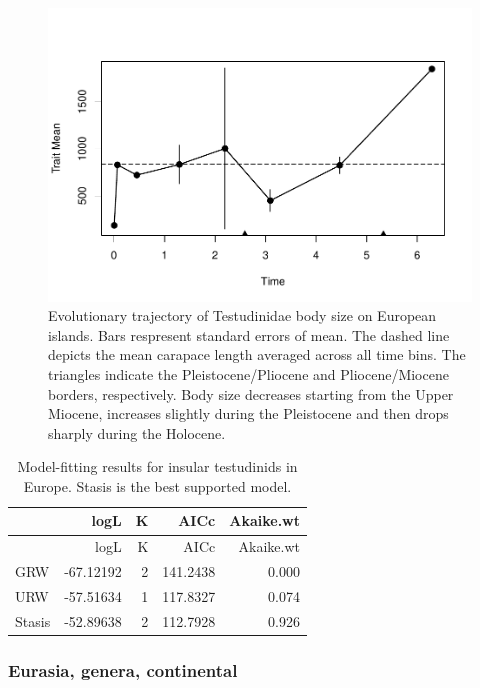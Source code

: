 \begin{figure}[H]
	\centering
	\includegraphics{MA_JJ_files/figure-latex/pTSEuI-1.pdf}
	\caption[PaleoTS plot of insular \T in Europe]{Evolutionary trajectory of Testudinidae body size on European islands. Bars respresent standard errors of mean. The dashed line depicts the mean carapace length averaged across all time bins. The triangles indicate the Pleistocene/Pliocene and Pliocene/Miocene borders, respectively. Body size decreases starting from the Upper Miocene, increases slightly during the Pleistocene and then drops sharply during the Holocene.
	}
	\label{fig:pTSEuI}
\end{figure}

\begin{longtable}[]{@{}lrrrr@{}}
	\caption[Model fits for insular \T in Europe]{Model-fitting results for insular testudinids in Europe. Stasis is the best supported model.}
	\label{tab:pTSEuIEM}\tabularnewline
	\toprule
	& logL & K & AICc & Akaike.wt\tabularnewline
	\midrule
	\endfirsthead
	\toprule
	& logL & K & AICc & Akaike.wt\tabularnewline
	\midrule
	\endhead
	GRW & -67.12192 & 2 & 141.2438 & 0.000\tabularnewline
	URW & -57.51634 & 1 & 117.8327 & 0.074\tabularnewline
	Stasis & -52.89638 & 2 & 112.7928 & 0.926\tabularnewline
	\bottomrule
\end{longtable}

\FloatBarrier




\subsubsection*{Eurasia, genera,
	continental}\label{eurasiagenera-continental}

